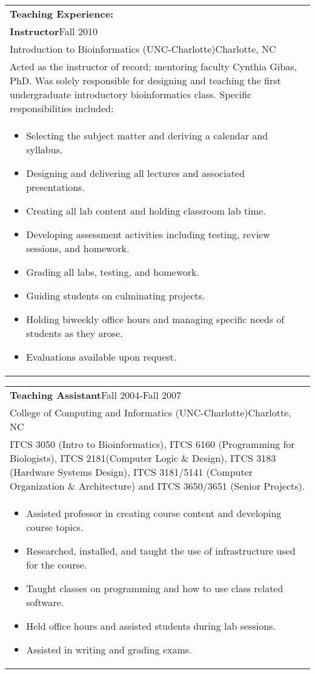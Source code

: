 \documentclass[12pt]{report}
\newenvironment{detailsList}
{\begin{itemize}
  \setlength{\itemsep}{1pt}
  \setlength{\parskip}{0pt}
  \setlength{\parsep}{0pt}
  \setlength{\partopsep}{0pt}
  \setlength{\topsep}{0pt}}
{\end{itemize}}
\def\fullLength{6.5in}
\begin{document}
\begin{table}[!h]
\begin{tabular}{p{\fullLength}}
\textbf{\Large Teaching Experience:}\\
\textbf{Instructor}\hfill Fall 2010\\
Introduction to Bioinformatics (UNC-Charlotte)\hfill Charlotte, NC\\
Acted as the instructor of record; mentoring faculty Cynthia Gibas, PhD. Was solely responsible for designing and teaching the first undergraduate introductory bioinformatics class. Specific responsibilities included:\\
\begin{detailsList}
\item Selecting the subject matter and deriving a calendar and syllabus.
\item Designing and delivering all lectures and associated presentations.
\item Creating all lab content and holding classroom lab time.
\item Developing assessment activities including testing, review sessions, and homework.
\item Grading all labs, testing, and homework.
\item Guiding students on culminating projects.
\item Holding biweekly office hours and managing specific needs of students as they arose.
\item Evaluations available upon request.
\end{detailsList}
\end{tabular}
\end{table}

\vspace{-7.0mm}

\begin{table}[!h]
\begin{tabular}{p{\fullLength}}
\textbf{Teaching Assistant}\hfill Fall 2004-Fall 2007\\
College of Computing and Informatics (UNC-Charlotte)\hfill Charlotte, NC\\
ITCS 3050 (Intro to Bioinformatics), ITCS 6160 (Programming for Biologists), ITCS 2181(Computer Logic \& Design), ITCS 3183 (Hardware Systems Design), ITCS 3181/5141 (Computer Organization \& Architecture) and ITCS 3650/3651 (Senior Projects).\\
\begin{detailsList}
\item Assisted professor in creating course content and developing course topics.
\item Researched, installed, and taught the use of infrastructure used for the course.
\item Taught classes on programming and how to use class related software.
\item Held office hours and assisted students during lab sessions.
\item Assisted in writing and grading exams.
\end{detailsList}
\end{tabular}
\end{table}
\end{document}
